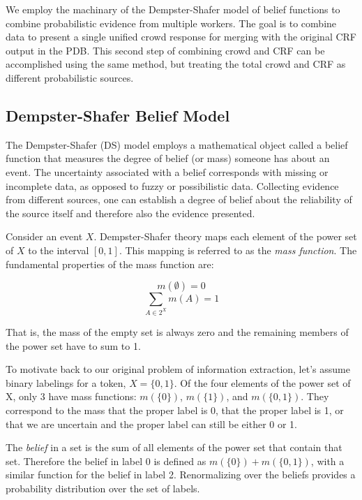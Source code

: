 We employ the machinary of the Dempster-Shafer model of belief functions to combine probabilistic evidence from multiple workers.  The goal is to combine data to present a single unified crowd response for merging with the original CRF output in the PDB.  This second step of combining crowd and CRF can be accomplished using the same method, but treating the total crowd and CRF as different probabilistic sources.

\subsection{Dempster-Shafer Belief Model}
The Dempster-Shafer (DS) model \cite{dempster67a, Shafer76} employs a mathematical object called a belief function that measures the degree of belief (or mass) someone has about an event.  The uncertainty associated with a belief corresponds with missing or incomplete data, as opposed to fuzzy or possibilistic data.  Collecting evidence from different sources, one can establish a degree of belief about the reliability of the source itself and therefore also the evidence presented.

Consider an event $X$.  Dempster-Shafer theory maps each element of the power set of $X$ to the interval $[0,1]$.  This mapping is referred to as the \textit{mass function}.  The fundamental properties of the mass function are:

\begin{equation}
m(\emptyset) = 0
\end{equation}
\begin{equation}
\sum_{A\in2^{X}} m(A) = 1
\end{equation}

That is, the mass of the empty set is always zero and the remaining members of the power set have to sum to 1.

To motivate back to our original problem of information extraction, let's assume binary labelings for a token, $X=\{0,1\}$.  Of the four elements of the power set of X, only 3 have mass functions: $m(\{0\})$, $m(\{1\})$, and $m(\{0,1\})$.  They correspond to the mass that the proper label is 0, that the proper label is 1, or that we are uncertain and the proper label can still be either 0 or 1.

The \textit{belief} in a set is the sum of all elements of the power set that contain that set.  Therefore the belief in label 0 is defined as $m(\{0\})+m(\{0,1\})$, with a similar function for the belief in label 2.  Renormalizing over the beliefs provides a probability distribution over the set of labels.

